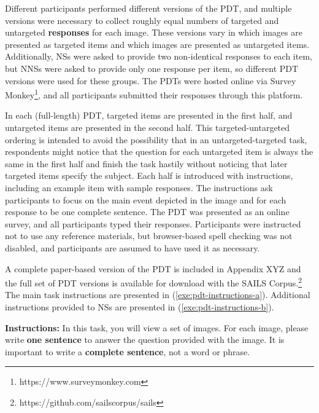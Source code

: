 Different participants performed different versions of the PDT, and multiple versions were necessary to collect roughly equal numbers of targeted and untargeted \textbf{responses} for each image. These versions vary in which images are presented as targeted items and which images are presented as untargeted items. Additionally, NSs were asked to provide two non-identical responses to each item, but NNSs were asked to provide only one response per item, so different PDT versions were used for these groups. The PDTs were hosted online via Survey Monkey\footnote{https://www.surveymonkey.com}, and all participants submitted their responses through this platform. %

In each (full-length) PDT, targeted items are presented in the first half, and untargeted items are presented in the second half. This targeted-untargeted ordering is intended to avoid the possibility that in an untargeted-targeted task, respondents might notice that the question for each untargeted item is always the same in the first half and finish the task hastily without noticing that later targeted items specify the subject. Each half is introduced with instructions, including an example item with sample responses. The instructions ask participants to focus on the main event depicted in the image and for each response to be one complete sentence. The PDT was presented as an online survey, and all participants typed their responses. Participants were instructed not to use any reference materials, but browser-based spell checking was not disabled, and participants are assumed to have used it as necessary.

A complete paper-based version of the PDT is included in Appendix XYZ  and the full set of PDT versions is available for download with the SAILS Corpus.\footnote{https://github.com/sailscorpus/sails} The main task instructions are presented in (\ref{exe:pdt-instructions-a}). Additional instructions provided to NSs are presented in (\ref{exe:pdt-instructions-b}).

\begin{exe}
  \ex\label{exe:pdt-instructions-a}\textbf{Instructions:} In this task, you will view a set of images. For each image, please write \textbf{one sentence} to answer the question provided with the image. It is important to write a \textbf{complete sentence}, not a word or phrase.
\end{exe}

